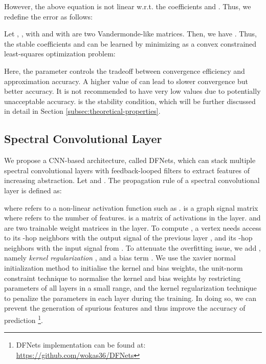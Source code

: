 \documentclass{article}
\begin{document}
However, the above equation is not linear w.r.t. the coefficients  and . Thus, we redefine the error as follows:

Let , ,  with  and  with  are two Vandermonde-like matrices. Then, we have .
 Thus, the stable coefficients   and  can be learned by minimizing  as a convex constrained least-squares optimization problem:


Here, the parameter  controls the tradeoff between convergence efficiency and approximation accuracy. A higher value of  can lead to slower convergence but better accuracy. It is not recommended to have very low  values due to potentially unacceptable accuracy.  is the stability condition, which will be further discussed in detail in Section \ref{subsec:theoretical-properties}.





\subsection{Spectral Convolutional Layer} 


We propose a CNN-based architecture, called DFNets, which can stack multiple spectral convolutional layers with feedback-looped filters to extract features of increasing abstraction. Let  and . The propagation rule of a spectral convolutional layer is defined as:



\noindent where  refers to a non-linear activation function such as .  is a graph signal matrix where  refers to the number of features.  is a matrix of activations in the  layer.  and  are two trainable weight matrices in the  layer. To compute , a vertex needs access to its -hop neighbors with the output signal of the previous layer , and its -hop neighbors with the input signal from . To attenuate the overfitting issue, we add , namely \emph{kernel regularization} \cite{cortes20092}, and a bias term . We use the xavier normal initialization method \cite{glorot2010understanding} to initialise the kernel and bias weights, the unit-norm constraint technique \cite{douglas2000gradient} to normalise the kernel and bias weights by restricting parameters of all layers in a small range, and the kernel regularization technique to penalize the parameters in each layer during the training.  In doing so, we can prevent the generation of spurious features and thus improve the accuracy of prediction 
\footnote{DFNets implementation can be found at: \href{https://github.com/wokas36/DFNets} {https://github.com/wokas36/DFNets}}.
\end{document}
